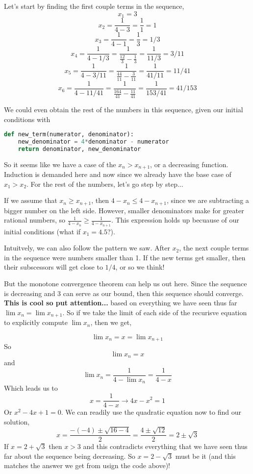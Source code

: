 Let's start by finding the first couple terms in the sequence,
$$
x_1 = 3
$$
$$
x_2 = \frac{1}{4 - 3} = \frac{1}{1} = 1
$$
$$
x_3 = \frac{1}{4 - 1} = \frac{1}{3} = 1/3
$$
$$
x_4 = \frac{1}{4 - 1/3} = \frac{1}{\frac{12}{3} - \frac{1}{3}} = \frac{1}{11/3} = 3/11
$$
$$
x_5 = \frac{1}{4 - 3/11} = \frac{1}{\frac{44}{11} - \frac{3}{11}} = \frac{1}{41/11} = 11/41
$$
$$
x_6 = \frac{1}{4 - 11/41} = \frac{1}{\frac{164}{41} - \frac{11}{41}} = \frac{1}{153/41} = 41/153
$$

We could even obtain the rest of the numbers in this sequence, given our initial conditions with
\begin{lstlisting}[language=Python]
def new_term(numerator, denominator):
    new_denominator = 4*denominator - numerator
    return denominator, new_denominator
\end{lstlisting}

So it seems like we have a case of the $x_n > x_{n+1}$, or a decreasing function.
Induction is demanded here and now since we already have the base case of $x_1 > x_2$.
For the rest of the numbers, let's go step by step...

If we assume that $x_n \geq x_{n+1}$, then $4 - x_n \leq 4 - x_{n+1}$, since we are subtracting a bigger number
on the left side.
However, smaller denominators make for greater rational numbers, so $\frac{1}{4-x_n} \geq \frac{1}{4 - x_{n+1}}$.
This expression holds up becuause of our initial conditions (what if $x_1 = 4.5$?).

Intuitvely, we can also follow the pattern we saw.
After $x_2$, the next couple terms in the sequence were numbers smaller than 1.
If the new terms get smaller, then their subscessors will get close to $1/4$, or so we think!

But the monotone convergence theorem can help us out here.
Since the sequence is decreasing and 3 can serve as our bound, then this sequence should converge.
\\

\textbf{This is cool so put attention...}
based on everything we have seen thus far $\lim x_n = \lim x_{n+1}$.
So if we take the limit of each side of the recurisve equation
to explicitly compute $\lim x_n$, then we get,

$$
\lim x_n = x = \lim x_{n+1}
$$
So
$$
\lim x_n = x
$$
and
$$
\lim x_n = \frac{1}{4- \lim x_n} = \frac{1}{4-x}
$$
Which leads us to
$$
x = \frac{1}{4-x} \rightarrow 4x - x^2 = 1
$$
Or $x^2 - 4x + 1 = 0$.
We can readily use the quadratic equation now to find our solution,
$$
x = \frac{ -(-4) \pm \sqrt{ 16 - 4 } }{2} = \frac{4 \pm \sqrt{12}}{2} = 2 \pm \sqrt{3}
$$
If $x = 2 + \sqrt{3}$ then $x>3$ and this contradicts everything that we have seen thus far about the sequence
being decreasing.
So $x = 2 - \sqrt{3}$ must be it (and this matches the answer we get from usign the code above)!
\\~\\


